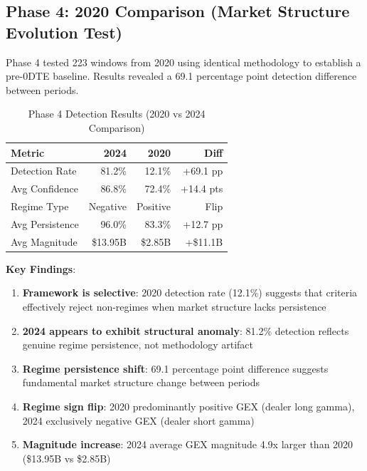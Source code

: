 \subsection{Phase 4: 2020 Comparison (Market Structure Evolution Test)}

\vspace{0.2cm}

Phase 4 tested 223 windows from 2020 using identical methodology to establish a pre-0DTE baseline. Results revealed a 69.1 percentage point detection difference between periods.

\begin{table}[ht]
\centering
\caption{Phase 4 Detection Results (2020 vs 2024 Comparison)}
\small
\begin{tabular}{lrrr}
\toprule
\textbf{Metric} & \textbf{2024} & \textbf{2020} & \textbf{Diff} \\
\midrule
Detection Rate & 81.2\% & 12.1\% & +69.1 pp \\
Avg Confidence & 86.8\% & 72.4\% & +14.4 pts \\
Regime Type & Negative & Positive & Flip \\
Avg Persistence & 96.0\% & 83.3\% & +12.7 pp \\
Avg Magnitude & \$13.95B & \$2.85B & +\$11.1B \\
\bottomrule
\end{tabular}
\end{table}

\vspace{0.2cm}

\noindent\textbf{Key Findings}:

\vspace{0.1cm}

\begin{enumerate}
\item \textbf{Framework is selective}: 2020 detection rate (12.1\%) suggests that criteria effectively reject non-regimes when market structure lacks persistence
\item \textbf{2024 appears to exhibit structural anomaly}: 81.2\% detection reflects genuine regime persistence, not methodology artifact
\item \textbf{Regime persistence shift}: 69.1 percentage point difference suggests fundamental market structure change between periods
\item \textbf{Regime sign flip}: 2020 predominantly positive GEX (dealer long gamma), 2024 exclusively negative GEX (dealer short gamma)
\item \textbf{Magnitude increase}: 2024 average GEX magnitude 4.9x larger than 2020 (\$13.95B vs \$2.85B)
\end{enumerate}

